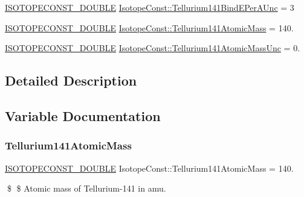 \begin{DoxyCompactItemize}
\mbox{\hyperlink{group___isotope_const-_macros_ga8f45a7272ce02c0b4c65c44636ed719a}{I\+S\+O\+T\+O\+P\+E\+C\+O\+N\+S\+T\+\_\+\+D\+O\+U\+B\+LE}} \mbox{\hyperlink{group___isotope_const-_tellurium-_te141_ga05a4db6271003c7a6d88a2ee9dbd8292}{Isotope\+Const\+::\+Tellurium141\+Bind\+E\+Per\+A\+Unc}} = 3
\item 
\mbox{\hyperlink{group___isotope_const-_macros_ga8f45a7272ce02c0b4c65c44636ed719a}{I\+S\+O\+T\+O\+P\+E\+C\+O\+N\+S\+T\+\_\+\+D\+O\+U\+B\+LE}} \mbox{\hyperlink{group___isotope_const-_tellurium-_te141_gac5bffa1f87b22239f6adef16de4aa73a}{Isotope\+Const\+::\+Tellurium141\+Atomic\+Mass}} = 140.
\item 
\mbox{\hyperlink{group___isotope_const-_macros_ga8f45a7272ce02c0b4c65c44636ed719a}{I\+S\+O\+T\+O\+P\+E\+C\+O\+N\+S\+T\+\_\+\+D\+O\+U\+B\+LE}} \mbox{\hyperlink{group___isotope_const-_tellurium-_te141_gac93e692061fc0aefb34382cebd4cd9ce}{Isotope\+Const\+::\+Tellurium141\+Atomic\+Mass\+Unc}} = 0.
\end{DoxyCompactItemize}


\subsection{Detailed Description}


\subsection{Variable Documentation}
\mbox{\label{group___isotope_const-_tellurium-_te141_gac5bffa1f87b22239f6adef16de4aa73a}} 
\subsubsection{\texorpdfstring{Tellurium141\+Atomic\+Mass}{Tellurium141AtomicMass}}
{\footnotesize\ttfamily \mbox{\hyperlink{group___isotope_const-_macros_ga8f45a7272ce02c0b4c65c44636ed719a}{I\+S\+O\+T\+O\+P\+E\+C\+O\+N\+S\+T\+\_\+\+D\+O\+U\+B\+LE}} Isotope\+Const\+::\+Tellurium141\+Atomic\+Mass = 140.}

\$ \$ Atomic mass of Tellurium-\/141 in amu. \mbox{\label{group___isotope_const-_tellurium-_te141_gac93e692061fc0aefb34382cebd4cd9ce}} 
